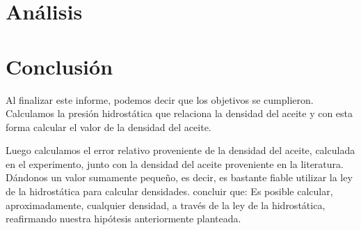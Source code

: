 \documentclass[a4paper, 12p]{article}
\begin{document}
\section{Análisis}

\section{Conclusión}

Al finalizar este informe, podemos decir que los objetivos se cumplieron. Calculamos la presión hidrostática que relaciona la densidad del aceite y con esta forma calcular el valor de la densidad del aceite.

Luego calculamos el error relativo proveniente de la densidad del aceite, calculada en el experimento, junto con la densidad del aceite proveniente en la literatura. Dándonos un valor sumamente pequeño, es decir, es bastante fiable utilizar la ley de la hidrostática para calcular densidades.
concluir que:
Es posible calcular, aproximadamente, cualquier densidad, a través de la ley de la hidrostática, reafirmando nuestra hipótesis anteriormente planteada.






\end{document}
